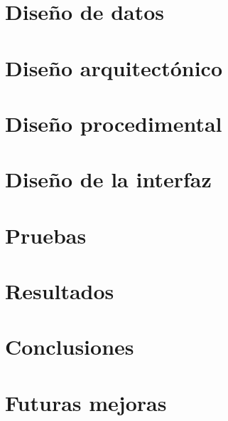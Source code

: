 \documentclass[a4paper,10pt,draft]{article}
\begin{document}
   \section{Diseño de datos}

   \section{Diseño arquitectónico}

   \section{Diseño procedimental}

   \section{Diseño de la interfaz}

   \section{Pruebas}

   \section{Resultados}

   \section{Conclusiones}

   \section{Futuras mejoras}
\end{document}
